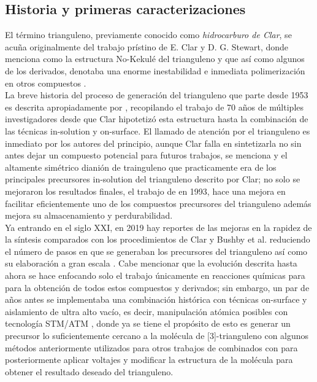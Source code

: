         \subsection{Historia y primeras caracterizaciones}
El término trianguleno, previamente conocido como \textit{hidrocarburo de Clar}, se acuña originalmente del trabajo prístino de E. Clar y D. G. Stewart, donde menciona como la estructura No-Kekulé del trianguleno y que así como algunos de los derivados, denotaba una enorme inestabilidad e inmediata polimerización en otros compuestos \cite{clar1953aromatic}.\\
La breve historia del proceso de generación del trianguleno que parte desde 1953 es descrita apropiadamente por \textcite{valenta2022taming}, recopilando el trabajo de 70 años de múltiples investigadores desde que Clar hipotetizó esta estructura hasta la combinación de las técnicas in-solution y on-surface. El llamado de atención por el trianguleno es inmediato por los autores del principio, aunque Clar falla en sintetizarla no sin antes dejar un compuesto potencial para futuros trabajos, se menciona \textcite{HARA19772435} y el altamente simétrico dianión de trainguleno que practicamente era de los principales precursores in-solution del trianguleno descrito por Clar; no solo se mejoraron los resultados finales, el trabajo de \textcite{bushby1993esr} en 1993, hace una mejora en facilitar eficientemente uno de los compuestos precursores del trianguleno además mejora su almacenamiento y perdurabilidad.\\
Ya entrando en el siglo XXI, en 2019 hay reportes de las mejoras en la rapidez de la síntesis comparados con los procedimientos de Clar y Bushby et al. reduciendo el número de pasos en que se generaban los precursores del trianguleno así como su elaboración a gran escala \cite{ribar2019gram, holt2019short}. Cabe mencionar que la evolución descrita hasta ahora se hace enfocando solo el trabajo únicamente en reacciones químicas para para la obtención de todos estos compuestos y derivados; sin embargo, un par de años antes se implementaba una combinación histórica con técnicas on-surface y aislamiento de ultra alto vacío, es decir, manipulación atómica posibles con tecnología STM/ATM \cite{pavlivcek2017synthesis}, donde ya se tiene el propósito de esto es generar un precursor lo suficientemente cercano a la molécula de [3]-trianguleno con algunos métodos anteriormente utilizados para otros trabajos de \citeauthor{ribar2019gram} combinados con \citeauthor{holt2019short} para posteriormente aplicar voltajes y modificar la estructura de la molécula para obtener el resultado deseado del trianguleno.\\
